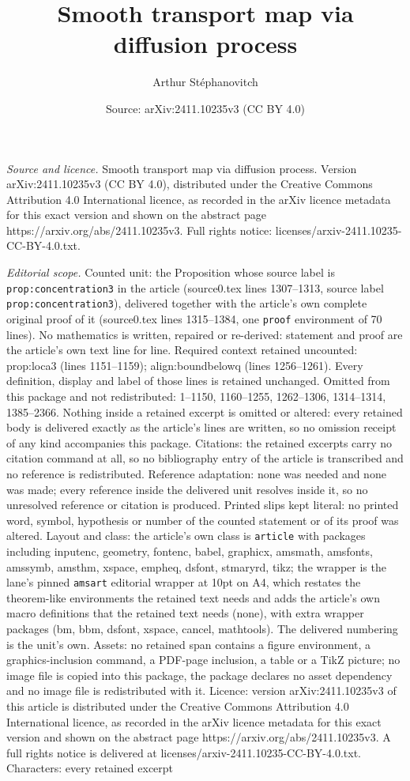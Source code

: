 \documentclass[10pt,a4paper]{amsart}
\title[Smooth transport map via diffusion process]{Smooth transport map via diffusion process}
\author{Arthur St\'ephanovitch}
\date{Source: arXiv:2411.10235v3 (CC BY 4.0)}
\begin{document}
\maketitle

\noindent\emph{Source and licence.} Smooth transport map via diffusion process. Version arXiv:2411.10235v3 (CC BY 4.0), distributed under the Creative Commons Attribution 4.0 International licence, as recorded in the arXiv licence metadata for this exact version and shown on the abstract page https://arxiv.org/abs/2411.10235v3. Full rights notice: licenses/arxiv-2411.10235-CC-BY-4.0.txt.\par\smallskip

\noindent\textit{Editorial scope.} Counted unit: the Proposition whose source label is \texttt{prop:concentration3} in the article (source0.tex lines 1307--1313, source label \texttt{prop:concentration3}), delivered together with the article's own complete original proof of it (source0.tex lines 1315--1384, one \texttt{proof} environment of 70 lines). No mathematics is written, repaired or re-derived: statement and proof are the article's own text line for line. Required context retained uncounted: prop:loca3 (lines 1151--1159); align:boundbelowq (lines 1256--1261). Every definition, display and label of those lines is retained unchanged. Omitted from this package and not redistributed: 1--1150, 1160--1255, 1262--1306, 1314--1314, 1385--2366. Nothing inside a retained excerpt is omitted or altered: every retained body is delivered exactly as the article's lines are written, so no omission receipt of any kind accompanies this package. Citations: the retained excerpts carry no citation command at all, so no bibliography entry of the article is transcribed and no reference is redistributed. Reference adaptation: none was needed and none was made; every reference inside the delivered unit resolves inside it, so no unresolved reference or citation is produced. Printed slips kept literal: no printed word, symbol, hypothesis or number of the counted statement or of its proof was altered. Layout and class: the article's own class is \texttt{article} with packages including inputenc, geometry, fontenc, babel, graphicx, amsmath, amsfonts, amssymb, amsthm, xspace, empheq, dsfont, stmaryrd, tikz; the wrapper is the lane's pinned \texttt{amsart} editorial wrapper at 10pt on A4, which restates the theorem-like environments the retained text needs and adds the article's own macro definitions that the retained text needs (none), with extra wrapper packages (bm, bbm, dsfont, xspace, cancel, mathtools). The delivered numbering is the unit's own. Assets: no retained span contains a figure environment, a graphics-inclusion command, a PDF-page inclusion, a table or a TikZ picture; no image file is copied into this package, the package declares no asset dependency and no image file is redistributed with it. Licence: version arXiv:2411.10235v3 of this article is distributed under the Creative Commons Attribution 4.0 International licence, as recorded in the arXiv licence metadata for this exact version and shown on the abstract page https://arxiv.org/abs/2411.10235v3. A full rights notice is delivered at licenses/arxiv-2411.10235-CC-BY-4.0.txt. Characters: every retained excerpt 
\end{document}
